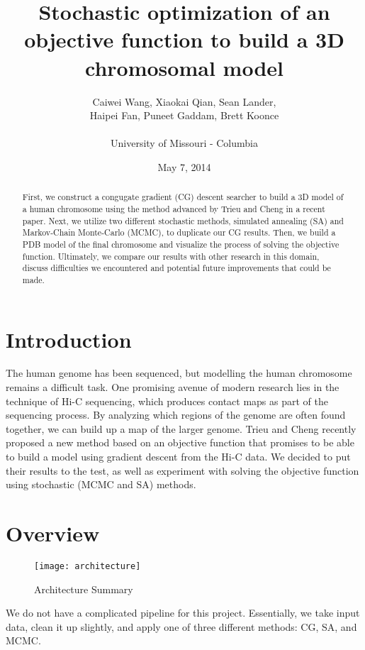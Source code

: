 \documentclass{article}
\title{Stochastic optimization of an objective function to build a 3D chromosomal model}
\author{Caiwei Wang, Xiaokai Qian, Sean Lander, \\Haipei Fan, Puneet Gaddam, Brett Koonce\\\\University of Missouri - Columbia}
\date{May 7, 2014}
\begin{document}
\maketitle

\begin{abstract}

First, we construct a congugate gradient (CG) descent searcher to build a 3D model of a human chromosome using the method advanced by Trieu and Cheng in a recent paper.  Next, we utilize two different stochastic methods, simulated annealing (SA) and Markov-Chain Monte-Carlo (MCMC), to duplicate our CG results.  Then, we build a PDB model of the final chromosome and visualize the process of solving the objective function.  Ultimately, we compare our results with other research in this domain, discuss difficulties we encountered and potential future improvements that could be made.

\end{abstract}

\section{Introduction}

The human genome has been sequenced, but modelling the human chromosome remains a difficult task.  One promising avenue of modern research lies in the technique of Hi-C sequencing, which produces contact maps as part of the sequencing process.  By analyzing which regions of the genome are often found together, we can build up a map of the larger genome.  Trieu and Cheng recently proposed a new method based on an objective function that promises to be able to build a model using gradient descent from the Hi-C data.  We decided to put their results to the test, as well as experiment with solving the objective function using stochastic (MCMC and SA) methods.

\section{Overview}

\begin{figure}[H]
\begin{center}
\texttt{[image: architecture]}
\caption{Architecture Summary}
\label{Fig:architecture}
\end{center}
\end{figure}

We do not have a complicated pipeline for this project.  Essentially, we take input data, clean it up slightly, and apply one of three different methods: CG, SA, and MCMC.
\end{document}
